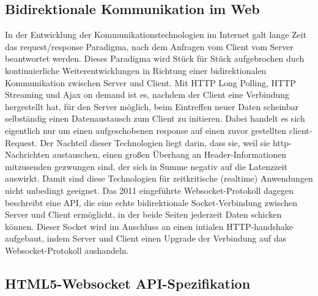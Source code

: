 \subsection{Bidirektionale Kommunikation im Web}
In der Entwicklung der Kommunikationstechnologien im Internet galt lange Zeit das request/response Paradigma, nach dem Anfragen vom Client vom Server beantwortet werden. Dieses Paradigma wird Stück für Stück aufgebrochen duch kontinuierliche Weiterentwicklungen in Richtung einer bidirektionalen Kommunikation zwischen Server und Client.
Mit HTTP Long Polling, HTTP Streaming und Ajax on demand ist es, nachdem der Client eine Verbindung hergestellt hat, für den Server möglich, beim Eintreffen neuer Daten scheinbar selbständig einen Datenaustausch zum Client zu initieren. Dabei handelt es sich eigentlich nur um einen aufgeschobenen response auf einen zuvor gestellten client-Request.
Der Nachteil dieser Technologien liegt darin, dass sie, weil sie http-Nachrichten austauschen, einen großen Überhang an Header-Informationen mitzusenden gezwungen sind, der sich in Summe negativ auf die Latenzzeit auswirkt. Damit sind diese Technologien für zeitkritische (realtime) Anwendungen nicht unbedingt geeignet.
Das 2011 eingeführte Websocket-Protokoll dagegen beschreibt eine API, die eine echte bidirektionale Socket-Verbindung zwischen Server und Client ermöglicht, in der beide Seiten jederzeit Daten schicken können. Dieser Socket wird im Anschluss an einen intialen HTTP-handshake aufgebaut, indem Server und Client  einen Upgrade der Verbindung auf das Websocket-Protokoll aushandeln. 


\subsection{HTML5-Websocket API-Spezifikation}


